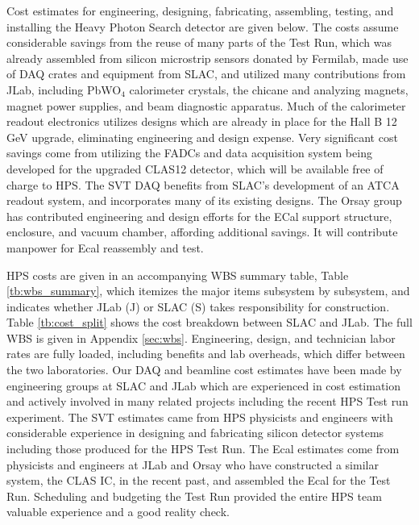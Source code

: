 \label{sec:schcost}

Cost estimates for engineering, designing, fabricating, assembling, testing, and installing the Heavy Photon Search detector 
are given below. The costs assume considerable savings from the reuse of many parts of the Test Run, which was already assembled 
from silicon microstrip sensors donated by Fermilab, made use of DAQ crates and equipment from SLAC,
and utilized many contributions from JLab, including PbWO$_4$ calorimeter crystals, the chicane and analyzing magnets, magnet power supplies,
and beam diagnostic apparatus. Much of the calorimeter readout electronics utilizes designs which are already in place for the Hall
B 12 GeV upgrade, eliminating engineering and design expense. Very significant cost savings come from utilizing the FADCs and data acquisition 
system being developed for the upgraded CLAS12 detector, which will be available free of charge to HPS. The SVT DAQ benefits from SLAC's 
development of an ATCA readout system, and incorporates many of its existing designs.  The Orsay group has
contributed engineering and design efforts for the ECal support structure, enclosure, and vacuum chamber, affording additional savings. It will
contribute manpower for Ecal reassembly and test.  

HPS costs are given in an accompanying WBS summary table, Table \ref{tb:wbs_summary}, which itemizes the major items subsystem by subsystem, and 
indicates whether JLab (J) or SLAC (S) takes responsibility for construction. 
Table \ref{tb:cost_split} shows the cost breakdown between SLAC and JLab.
The full WBS is given in Appendix \ref{sec:wbs}.
Engineering, design, and technician labor rates are fully loaded, 
including benefits and lab overheads, which differ between the two laboratories. Our 
DAQ and beamline cost estimates have been made by engineering groups at SLAC and JLab which are experienced in cost estimation and 
actively involved in many related projects including the recent HPS Test run experiment. The SVT estimates came from HPS physicists and engineers  with
considerable experience in designing and fabricating silicon detector systems including those produced for the HPS Test Run. 
The Ecal estimates come from physicists and engineers at 
JLab and Orsay who have constructed a similar system, the CLAS IC, in the recent past, and assembled the Ecal for the Test Run.
Scheduling and budgeting the Test Run provided the entire HPS team valuable experience and a good reality check. 


